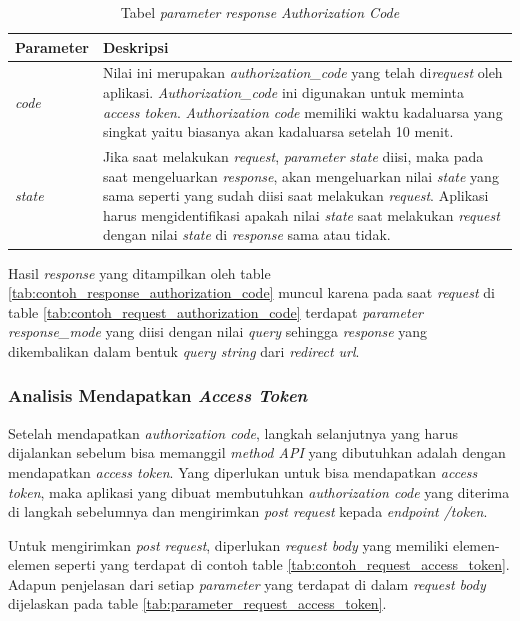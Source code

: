 \begin{table}[H]
	\centering 
	\caption{Tabel \textit{parameter} \textit{response} \textit{Authorization Code}}
	\label{tab:parameter_response_authorization_code}
	\begin{tabular}{|p{3cm}|p{9cm}|}
	\toprule
	\textbf{Parameter} & \textbf{Deskripsi}\\ \hline 
	\textit{code} & Nilai ini merupakan \textit{authorization\_code} yang telah di\textit{request} oleh aplikasi. \textit{Authorization\_code} ini digunakan untuk meminta \textit{access token}. \textit{Authorization code} memiliki waktu kadaluarsa yang singkat yaitu biasanya akan kadaluarsa setelah 10 menit. \\ \hline 
	\textit{state} & Jika saat melakukan \textit{request}, \textit{parameter} \textit{state} diisi, maka pada saat mengeluarkan \textit{response}, akan mengeluarkan nilai \textit{state} yang sama seperti yang sudah diisi saat melakukan \textit{request}. Aplikasi harus mengidentifikasi apakah nilai \textit{state} saat melakukan \textit{request} dengan nilai \textit{state} di \textit{response} sama atau tidak. \\ \bottomrule
\end{tabular}  
\end{table}

Hasil \textit{response} yang ditampilkan oleh table \ref{tab:contoh_response_authorization_code} muncul karena pada saat \textit{request} di table \ref{tab:contoh_request_authorization_code} terdapat \textit{parameter} \textit{response\_mode} yang diisi dengan nilai \textit{query} sehingga \textit{response} yang dikembalikan dalam bentuk \textit{query string} dari \textit{redirect url}. 

\subsubsection{Analisis Mendapatkan \textit{Access Token}}
\label{analisis_access_token}

Setelah mendapatkan \textit{authorization code}, langkah selanjutnya yang harus dijalankan sebelum bisa memanggil \textit{method API} yang dibutuhkan adalah dengan mendapatkan \textit{access token}. Yang diperlukan untuk bisa mendapatkan \textit{access token}, maka aplikasi yang dibuat membutuhkan \textit{authorization code} yang diterima di langkah sebelumnya dan mengirimkan \textit{post request} kepada \textit{endpoint /token}. 

Untuk mengirimkan \textit{post request}, diperlukan \textit{request body} yang memiliki elemen-elemen seperti yang terdapat di contoh table \ref{tab:contoh_request_access_token}. Adapun penjelasan dari setiap \textit{parameter} yang terdapat di dalam \textit{request body} dijelaskan pada table \ref{tab:parameter_request_access_token}. 

